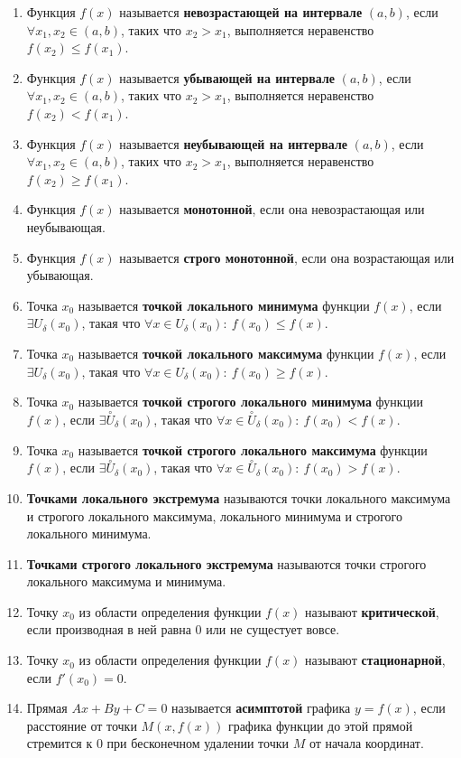 \begin{enumerate}
\item Функция $f(x)$ называется \textbf{невозрастающей на интервале} $(a, b)$, если $\forall x_1, x_2 \in (a, b)$, таких что $x_2 > x_1$, выполняется неравенство $f(x_2)\leqslant f(x_1)$.
\item Функция $f(x)$ называется \textbf{убывающей на интервале} $(a, b)$, если $\forall x_1, x_2 \in (a, b)$, таких что $x_2 > x_1$, выполняется неравенство $f(x_2)<f(x_1)$.
\item Функция $f(x)$ называется \textbf{неубывающей на интервале} $(a, b)$, если $\forall x_1, x_2 \in (a, b)$, таких что $x_2 > x_1$, выполняется неравенство $f(x_2)\geqslant f(x_1)$.
\item Функция $f(x)$ называется \textbf{монотонной}, если она невозрастающая или неубывающая.
\item Функция $f(x)$ называется \textbf{строго монотонной}, если она возрастающая или убывающая.
\item Точка $x_0$ называется \textbf{точкой локального минимума} функции $f(x)$, если $\exists U_{\delta}(x_0)$, такая что $\forall x \in U_{\delta}(x_0): \ f(x_0) \leqslant f(x)$.
\item Точка $x_0$ называется \textbf{точкой локального максимума} функции $f(x)$, если $\exists U_{\delta}(x_0)$, такая что $\forall x \in U_{\delta}(x_0): \ f(x_0) \geqslant f(x)$.
\item Точка $x_0$ называется \textbf{точкой строгого локального минимума} функции $f(x)$, если $\exists \overset{\circ}{U}_{\delta}(x_0)$, такая что $\forall x \in \overset{\circ}{U}_{\delta}(x_0): \ f(x_0) < f(x)$.
\item Точка $x_0$ называется \textbf{точкой строгого локального максимума} функции $f(x)$, если $\exists \overset{\circ}{U}_\delta(x_0)$, такая что $\forall x \in \overset{\circ}{U}_\delta(x_0): \ f(x_0) > f(x)$.
\item \textbf{Точками локального экстремума} называются точки локального максимума и строгого локального максимума, локального минимума и строгого локального минимума.
\item \textbf{Точками строгого локального экстремума} называются точки строгого локального максимума и минимума.
\item Точку $x_0$ из области определения функции $f(x)$ называют \textbf{критической}, если производная в ней равна 0 или не сущестует вовсе.
\item Точку $x_0$ из области определения функции $f(x)$ называют \textbf{стационарной}, если
$f'(x_0) = 0$.
\item Прямая $Ax + By + C = 0$ называется \textbf{асимптотой} графика $y = f(x)$, если расстояние от точки $M(x, f(x))$ графика функции до этой прямой стремится к 0 при бесконечном удалении точки $M$ от начала координат.

\end{enumerate}
